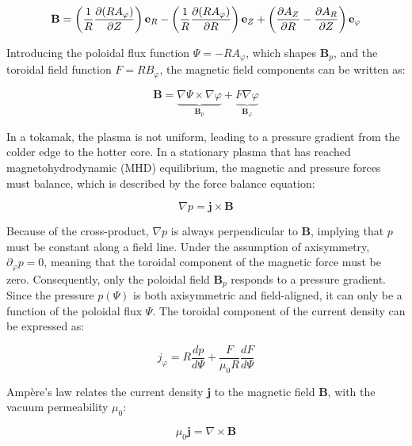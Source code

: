 \begin{equation}
	\mathbf{B} = \left(\frac{1}{R}\pdv{(RA_\varphi)}{Z}\right)\mathbf{e}_R - \left(\frac{1}{R}\pdv{(RA_\varphi)}{R}\right)\mathbf{e}_Z + \left(\pdv{A_Z}{R} - \pdv{A_R}{Z}\right)\mathbf{e}_\varphi
\end{equation}

Introducing the poloidal flux function \(\Psi = -RA_\varphi\), which shapes \(\mathbf{B}_p\), and the toroidal field function \(F = RB_\varphi\), the magnetic field components can be written as:

\begin{equation}
	\label{eq:intro_BeqMagneticFluxes}
	\mathbf{B} = \underbrace{\nabla \Psi \times \nabla \varphi}_{\mathbf{B}_p} + \underbrace{F \nabla \varphi}_{\mathbf{B}_\varphi}
\end{equation}

In a tokamak, the plasma is not uniform, leading to a pressure gradient from the colder edge to the hotter core. In a stationary plasma that has reached magnetohydrodynamic (MHD) equilibrium, the magnetic and pressure forces must balance, which is described by the force balance equation:

\begin{equation}
	\nabla p = \mathbf{j} \times \mathbf{B}
\end{equation}

Because of the cross-product, $\nabla p$ is always perpendicular to $\mathbf{B}$, implying that $p$ must be constant along a field line. Under the assumption of axisymmetry, $\partial_\varphi p = 0$, meaning that the toroidal component of the magnetic force must be zero. Consequently, only the poloidal field $\mathbf{B}_p$ responds to a pressure gradient. Since the pressure $p(\Psi)$ is both axisymmetric and field-aligned, it can only be a function of the poloidal flux $\Psi$. The toroidal component of the current density can be expressed as:

\begin{equation}
	j_\varphi = R\frac{dp}{d\Psi} + \frac{F}{\mu_0 R}\frac{dF}{d\Psi}
\end{equation}

Ampère's law relates the current density $\mathbf{j}$ to the magnetic field $\mathbf{B}$, with the vacuum permeability $\mu_0$:

\begin{equation}
	\mu_0\mathbf{j} = \nabla \times \mathbf{B}
\end{equation}


